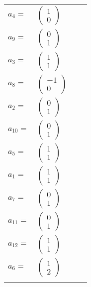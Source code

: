\documentclass[1p]{elsarticle_modified}
\theoremstyle{definition}
\begin{document}
\begin{tabular}{m{7pt} m{180pt} m{7pt} m{180pt} }
\flushright $a_{4}=$&$\begin{pmatrix}1\\0\end{pmatrix}$ \\
\flushright $a_{9}=$&$\begin{pmatrix}0\\1\end{pmatrix}$ \\
\flushright $a_{3}=$&$\begin{pmatrix}1\\1\end{pmatrix}$ \\
\flushright $a_{8}=$&$\begin{pmatrix}-1\\0\end{pmatrix}$ \\
\flushright $a_{2}=$&$\begin{pmatrix}0\\1\end{pmatrix}$ \\
\flushright $a_{10}=$&$\begin{pmatrix}0\\1\end{pmatrix}$ \\
\flushright $a_{5}=$&$\begin{pmatrix}1\\1\end{pmatrix}$ \\
\flushright $a_{1}=$&$\begin{pmatrix}1\\1\end{pmatrix}$ \\
\flushright $a_{7}=$&$\begin{pmatrix}0\\1\end{pmatrix}$ \\
\flushright $a_{11}=$&$\begin{pmatrix}0\\1\end{pmatrix}$ \\
\flushright $a_{12}=$&$\begin{pmatrix}1\\1\end{pmatrix}$ \\
\flushright $a_{6}=$&$\begin{pmatrix}1\\2\end{pmatrix}$\\&\end{tabular}
\end{document}
